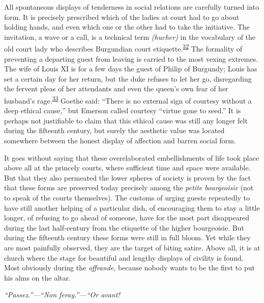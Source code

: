All spontaneous displays of tenderness in social relations are carefully
turned into form. It is precisely prescribed which of the ladies at
court had to go about holding hands, and even which one or the other had
to take the initiative. The invitation, a wave or a call, is a technical
term \emph{(hucher)} in the vocabulary of the old court lady who
describes Burgundian court
etiquette.\textsuperscript{\protect\hypertarget{09_Chapter_Two__THE_CRAVING_FOR_A_M.xhtmlux5cux23id_2023}{\protect\hyperlink{23_NOTES.xhtmlux5cux23id_2024}{32}}}
The formality of preventing a departing guest from leaving is carried to
the most vexing extremes. The wife of Louis XI is for a few days the
guest of Philip of Burgundy; Louis has set a certain day for her return,
but the duke refuses to let her go, disregarding the fervent pleas of
her attendants and even the queen's own fear of her husband's
rage.\textsuperscript{\protect\hypertarget{09_Chapter_Two__THE_CRAVING_FOR_A_M.xhtmlux5cux23id_2021}{\protect\hyperlink{23_NOTES.xhtmlux5cux23id_2022}{33}}}
Goethe said: ``There is no external sign of courtesy without a deep
ethical cause,'' but Emerson called courtesy ``virtue gone to seed.'' It
is perhaps not justifiable to claim that this ethical cause was still
any longer felt during the fifteenth century, but surely the aesthetic
value was located somewhere between the honest display of affection and
barren social form.

\protect\hypertarget{09_Chapter_Two__THE_CRAVING_FOR_A_M.xhtmlux5cux23page_48}{}{}It
goes without saying that these overelaborated embellishments of life
took place above all at the princely courts, where sufficient time and
space were available. But that they also permeated the lower spheres of
society is proven by the fact that these forms are preserved today
precisely among the \emph{petite bourgeoisie} (not to speak of the
courts themselves). The customs of urging guests repeatedly to have
still another helping of a particular dish, of encouraging them to stay
a little longer, of refusing to go ahead of someone, have for the most
part disappeared during the last half-century from the etiquette of the
higher bourgeoisie. But during the fifteenth century these forms were
still in full bloom. Yet while they are most painfully observed, they
are the target of biting satire. Above all, it is at church where the
stage for beautiful and lengthy displays of civility is found. Most
obviously during the \emph{offrande}, because nobody wants to be the
first to put his alms on the altar.

\emph{``Passez.''---``Non feray.''---``Or avant!}

